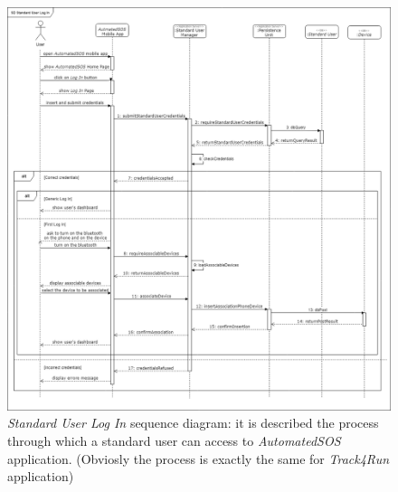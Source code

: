 \begin{figure}[H]
  \begin{center}
  	\includegraphics[width=\textwidth]{./img/sequence/appLogIn.png}
    \hspace{0.05\linewidth}
    \centering
    \caption{\textit{Standard User Log In} sequence diagram: it is described the process through which a standard user can access to \textit{AutomatedSOS} application. (Obviosly the process is exactly the same for \textit{Track4Run} application)}
		\label{img:appLogIn}
    \end{center}
\end{figure}

